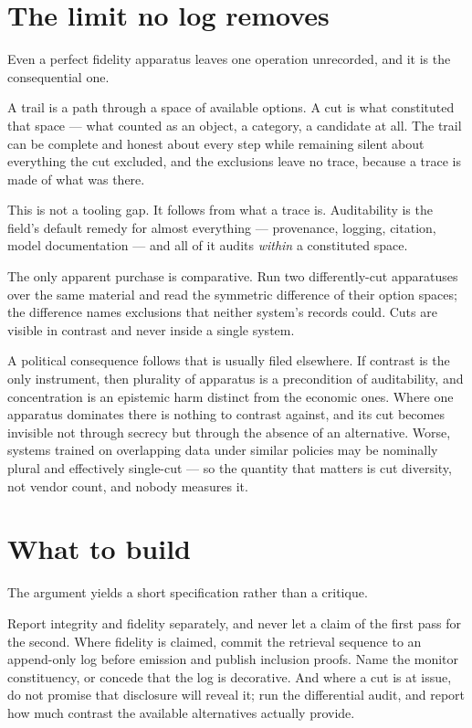 \documentclass[11pt,a4paper]{article}
\begin{document}
\section{The limit no log removes}
Even a perfect fidelity apparatus leaves one operation unrecorded, and it is the consequential one.

A trail is a path through a space of available options. A cut is what constituted that space --- what counted as an object, a category, a candidate at all. The trail can be complete and honest about every step while remaining silent about everything the cut excluded, and the exclusions leave no trace, because a trace is made of what was there.

This is not a tooling gap. It follows from what a trace is. Auditability is the field's default remedy for almost everything --- provenance, logging, citation, model documentation --- and all of it audits \emph{within} a constituted space.

The only apparent purchase is comparative. Run two differently-cut apparatuses over the same material and read the symmetric difference of their option spaces; the difference names exclusions that neither system's records could. Cuts are visible in contrast and never inside a single system.

A political consequence follows that is usually filed elsewhere. If contrast is the only instrument, then plurality of apparatus is a precondition of auditability, and concentration is an epistemic harm distinct from the economic ones. Where one apparatus dominates there is nothing to contrast against, and its cut becomes invisible not through secrecy but through the absence of an alternative. Worse, systems trained on overlapping data under similar policies may be nominally plural and effectively single-cut --- so the quantity that matters is cut diversity, not vendor count, and nobody measures it.

\section{What to build}
The argument yields a short specification rather than a critique.

Report integrity and fidelity separately, and never let a claim of the first pass for the second. Where fidelity is claimed, commit the retrieval sequence to an append-only log before emission and publish inclusion proofs. Name the monitor constituency, or concede that the log is decorative. And where a cut is at issue, do not promise that disclosure will reveal it; run the differential audit, and report how much contrast the available alternatives actually provide.
\end{document}
